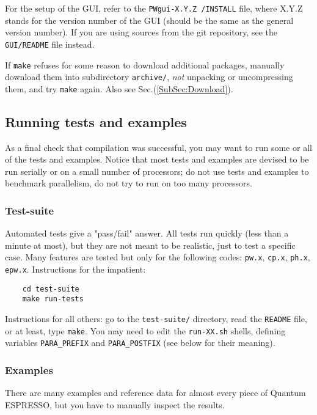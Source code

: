 \documentclass[12pt,a4paper]{article}
\def\qe{{\sc Quantum ESPRESSO}}
\def\pwx{\texttt{pw.x}}
\def\cpx{\texttt{cp.x}}
\def\phx{\texttt{ph.x}}
\def\epwx{\texttt{epw.x}}
\def\make{\texttt{make}}
\begin{document}
For the setup of the GUI, refer to the \texttt{PWgui-X.Y.Z /INSTALL} file, where
X.Y.Z stands for the version number of the GUI (should be the same as the
general version number). If you are using sources from the git repository, see
the \texttt{GUI/README} file instead.

If \texttt{make} refuses for some reason to download additional
packages, manually download them into subdirectory
\texttt{archive/}, {\em not} unpacking or uncompressing them,
and try \texttt{make} again. Also see Sec.(\ref{SubSec:Download}).

\subsection{Running tests and examples}
\label{SubSec:Examples}

As a final check that compilation was successful, you may want to run some or
all of the tests and examples. 
Notice that most tests and examples are devised to be run serially
or on a small number of processors; do not use tests and examples
to benchmark parallelism, do not try to run on too many processors.

\subsubsection{Test-suite}
Automated tests give a "pass/fail" answer. All tests run quickly 
(less than a minute at most), but they are not meant to be realistic, 
just to test a specific case. Many features are tested but only for
the following codes: \pwx, \cpx, \phx, \epwx.
Instructions for the impatient:
\begin{verbatim}
    cd test-suite
    make run-tests
\end{verbatim}
Instructions for all others: go to the \texttt{test-suite/} directory,
read the \texttt{README} file, or at least, type \make. You may need
to edit the \texttt{run-XX.sh} shells, defining variables
\texttt{PARA\_PREFIX} and \texttt{PARA\_POSTFIX} (see below for their
meaning).

\subsubsection{Examples}
There are many examples and reference data for almost every piece of \qe,
but you have to manually inspect the results.
\end{document}
